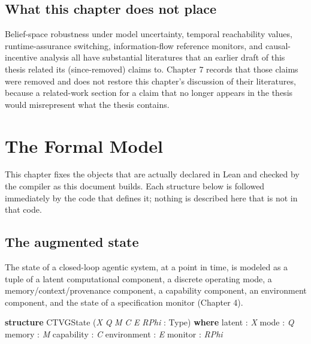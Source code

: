 \documentclass{memoir}
\begin{document}
\section{What this chapter does not place}\label{Capability--Monotonicity--in--a--Formal--Skeleton--for--Agentic--AI--Safety----Related--Work----What--this--chapter--does--not--place}

Belief-space robustness under model uncertainty, temporal reachability
values, runtime-assurance switching, information-flow reference monitors,
and causal-incentive analysis all have substantial literatures that an
earlier draft of this thesis related its (since-removed) claims to. Chapter
7 records that those claims were removed and does not restore this
chapter's discussion of their literatures, because a related-work section
for a claim that no longer appears in the thesis would misrepresent what the
thesis contains.





\chapter{The Formal Model}\label{Capability--Monotonicity--in--a--Formal--Skeleton--for--Agentic--AI--Safety----The--Formal--Model}

This chapter fixes the objects that are actually declared in Lean and
checked by the compiler as this document builds. Each structure below is
followed immediately by the code that defines it; nothing is described here
that is not in that code.



\section{The augmented state}\label{Capability--Monotonicity--in--a--Formal--Skeleton--for--Agentic--AI--Safety----The--Formal--Model----The--augmented--state}

The state of a closed-loop agentic system, at a point in time, is modeled as
a tuple of a latent computational component, a discrete operating mode, a
memory/context/provenance component, a capability component, an
environment component, and the state of a specification monitor (Chapter 4).

\begin{LeanVerbatim}
\textbf{structure} CTVGState (\textit{X} \textit{Q} \textit{M} \textit{C} \textit{E} \textit{RPhi} : Type) \textbf{where}
  latent      : \textit{X}
  mode        : \textit{Q}
  memory      : \textit{M}
  capability  : \textit{C}
  environment : \textit{E}
  monitor     : \textit{RPhi}

\end{LeanVerbatim}
\end{document}
